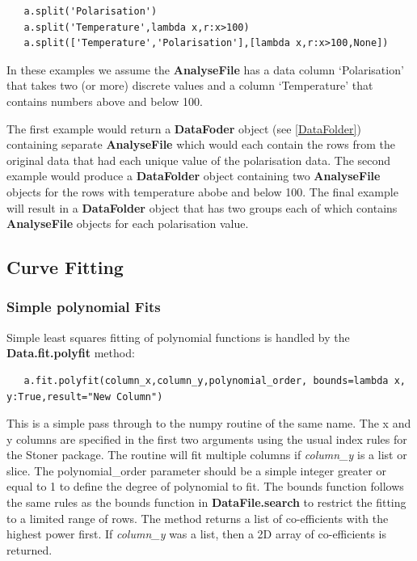 \documentclass[a4paper,11pt]{scrartcl}
\begin{document}
\begin{lstlisting}
   a.split('Polarisation')
   a.split('Temperature',lambda x,r:x>100)
   a.split(['Temperature','Polarisation'],[lambda x,r:x>100,None])
\end{lstlisting}

In these examples we assume the \textbf{AnalyseFile} has a data column `Polarisation' that takes two (or more) discrete values
and a column `Temperature' that contains numbers above and below 100.

The first example would return a \textbf{DataFoder} object (see \ref{DataFolder}) containing separate \textbf{AnalyseFile} which
would each contain the rows from the original data that had each unique value of the polarisation data. The second example would
produce a \textbf{DataFolder} object containing two \textbf{AnalyseFile} objects for the rows with temperature abobe and below 100.
The final example will result in a \textbf{DataFolder} object that has two groups each of which contains \textbf{AnalyseFile} objects for each
polarisation value.

\subsection{Curve Fitting}

\subsubsection{Simple polynomial Fits}

Simple least squares fitting of polynomial functions is handled by the
\textbf{Data.fit.polyfit} method:

\begin{lstlisting}
   a.fit.polyfit(column_x,column_y,polynomial_order, bounds=lambda x, y:True,result="New Column")
\end{lstlisting}

This is a simple pass through to the numpy routine of the same name. The x and y
columns are specified in the first two arguments using the usual index rules for
the Stoner package. The routine will fit multiple columns if \textit{column\_y}
is a list or slice. The polynomial\_order parameter should be a simple integer
greater or equal to 1 to define the degree of polynomial to fit. The bounds
function follows the same rules as the bounds function in
\textbf{DataFile.search} to restrict the fitting to a limited range of rows. The
method returns a list of co-efficients with the highest power first. If
\textit{column\_y} was a list, then a 2D array of co-efficients is returned.
\end{document}

